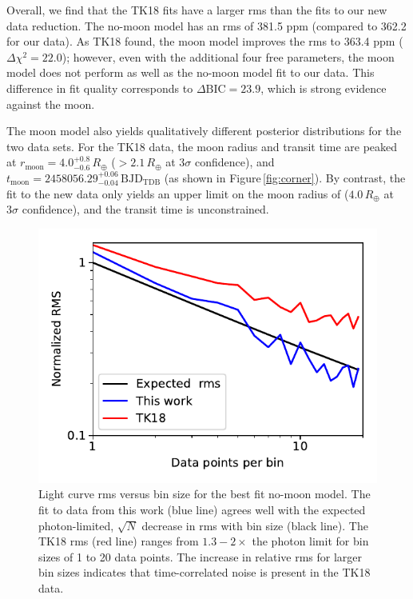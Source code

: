 \documentclass[twocolumn]{aastex62}
\begin{document}
Overall, we find that the TK18 fits have a larger rms than the fits to our new data reduction. The no-moon model has an rms of 381.5 ppm (compared to 362.2 for our data). As TK18 found, the moon model improves the rms to 363.4 ppm ($\Delta\chi^2 = 22.0$); however, even with the additional four free parameters, the moon model does not perform as well as the no-moon model fit to our data.  This difference in fit quality corresponds to $\Delta\mathrm{BIC} = 23.9$, which is strong evidence against the moon.  

The moon model also yields qualitatively different posterior distributions for the two data sets.  For the TK18 data, the moon radius and transit time are peaked at $r_\mathrm{moon} = 4.0^{+0.8}_{-0.6}\,R_\oplus$ ($>2.1\,R_\oplus$ at $3\sigma$ confidence), and $t_\mathrm{moon} =  2458056.29^{+0.06}_{-0.04}\,\mathrm{BJD_{TDB}}$ (as shown in Figure\,\ref{fig:corner}). By contrast, the fit to the new data only yields an upper limit on the moon radius of ($4.0\,R_\oplus$ at $3\sigma$ confidence), and the transit time is unconstrained.






\begin{figure}
\includegraphics[width = 0.5 \textwidth]{figures/fig2_rms.pdf}
    \caption{Light curve rms versus bin size for the best fit no-moon model. The fit to data from this work (blue line) agrees well with the expected photon-limited, $\sqrt{N}$ decrease in rms with bin size (black line). The TK18 rms (red line) ranges from $1.3 - 2\times$ the photon limit for bin sizes of 1 to 20 data points. The increase in relative rms for larger bin sizes indicates that time-correlated noise is present in the TK18 data.}
\label{fig:rms}
\end{figure}
\end{document}
